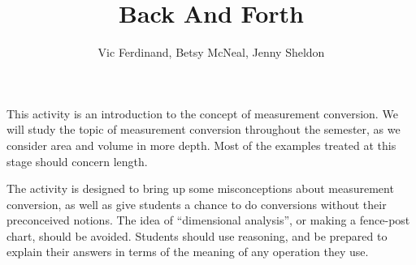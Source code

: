 \documentclass[handout]{ximera}
\title{Back And Forth}
\author{Vic Ferdinand, Betsy McNeal, Jenny Sheldon}
\begin{document}
\begin{abstract}\end{abstract}
\maketitle

\begin{instructorIntro}
This activity is an introduction to the concept of measurement conversion.  We will study the topic of measurement conversion throughout the semester, as we consider area and volume in more depth.  Most of the examples treated at this stage should concern length.

The activity is designed to bring up some misconceptions about measurement conversion, as well as give students a chance to do conversions without their preconceived notions.  The idea of ``dimensional analysis'', or making a fence-post chart, should be avoided.  Students should use reasoning, and be prepared to explain their answers in terms of the meaning of any operation they use.


\end{instructorIntro}
\end{document}

